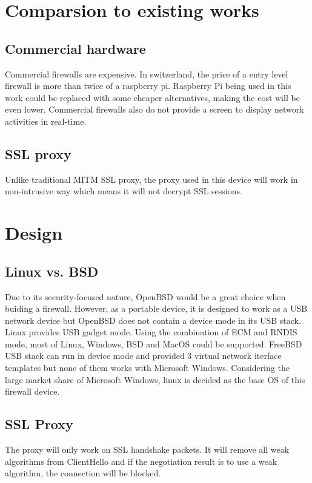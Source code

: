 \documentclass[mscthesis]{usiinfthesis}
\begin{document}
\chapter{Comparsion to existing works}
\section{Commercial hardware}
Commercial firewalls are expensive. In switzerland, the price of a entry 
level firewall is more than twice of a raspberry pi. Raspberry Pi being
used in this work could be replaced with some cheaper alternatives, making 
the cost will be even lower. Commercial firewalls also do not provide a 
screen to display network activities in real-time.

\section{SSL proxy}
Unlike traditional MITM SSL proxy, the proxy used in this device will work 
in non-intrusive way which means it will not decrypt SSL sessions.

\chapter[Design]{Design}

\section{Linux vs. BSD}

Due to its security-focused nature, OpenBSD would be a great choice when buiding a firewall. However, as a portable device, it is designed to work as a USB network device but OpenBSD does not contain a device mode in its USB stack. Linux provides USB gadget mode. Using the combination of ECM and RNDIS mode, most of Linux, Windows, BSD and MacOS could be supported. FreeBSD USB stack can run in device mode and provided 3 virtual network iterface templates but none of them works with Microsoft Windows\citet{freebsdhb:usb}. Considering the large market share of Microsoft Windows, linux is decided as the base OS of this firewall device.

\section{SSL Proxy}

The proxy will only work on SSL handshake packets. It will remove all weak algorithms from ClientHello and if the negotiation result is to use a weak algorithm, the connection will be blocked.
\end{document}
